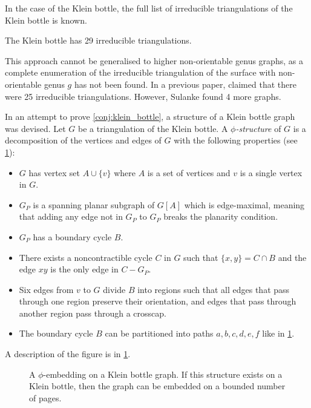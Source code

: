 In the case of the Klein bottle, the full list of irreducible triangulations of the Klein bottle is known. 
\begin{theorem}
    The Klein bottle has 29 irreducible triangulations. 
\end{theorem} 
This approach cannot be generalised to higher non-orientable genus graphs, as a complete enumeration of the irreducible triangulation of the surface with non-orientable genus $g$ has not been found.
In a previous paper, \textcite{lawrencenkoIrreducibleTriangulationsKlein1997} claimed that there were 25 irreducible triangulations. However, Sulanke found 4 more graphs.

In an attempt to prove \cref{conj:klein_bottle}, a structure of a Klein bottle graph was devised. Let $G$ be a triangulation of the Klein bottle. A \textit{$\phi$-structure} of $G$ is a decomposition of the vertices and edges of $G$ with the following properties (see \cref{fig:phiembedding}):
\begin{itemize}
    \item $G$ has vertex set $A \cup \{v\}$ where $A$ is a set of vertices and $v$ is a single vertex in $G$.
    \item $G_P$ is a spanning planar subgraph of $G[A]$ which is edge-maximal, meaning that adding any edge not in $G_P$ to $G_P$ breaks the planarity condition.
    \item $G_P$ has a boundary cycle $B$.
    \item There exists a noncontractible cycle $C$ in $G$ such that $\{x, y\} = C \cap B$ and the edge $xy$ is the only edge in $C - G_P$. 
    \item Six edges from $v$ to $G$ divide $B$ into regions such that all edges that pass through one region preserve their orientation, and edges that pass through another region pass through a crosscap. 
    \item The boundary cycle $B$ can be partitioned into paths $a, b, c, d, e, f$ like in \cref{fig:phiembedding}. 
\end{itemize}

A description of the figure is in \cref{fig:phiembedding}.

\begin{figure}[h]
    \centering
    
    \caption[$\phi$-embedding of a Klein bottle graph.]{ A $\phi$-embedding on a Klein bottle graph. If this structure exists on a Klein bottle, then the graph can be embedded on a bounded number of pages. }\label{fig:phiembedding}
\end{figure}

